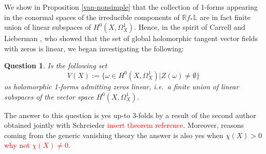 \documentclass[12pt,reqno]{amsart}
\theoremstyle{question}
\newtheorem{question}[theorem]{Question}
\theoremstyle{definition}
\theoremstyle{remark}
\newtheorem{remark}[theorem]{Remark}
\theoremstyle{cited}
\theoremstyle{citeddef}
\newcommand{\bbL}{\mathbb{L}}
\newcommand{\bbR}{\mathbb{R}}
\newcommand{\sorry}[1]{\textcolor{red}{#1}}
\begin{document}

We show in Proposition \ref{van-nonsimple} that the collection
of 1-forms appearing in the conormal spaces of the
irreducible components of $\bbR f_*\bbL$ are in fact finite union of linear subspaces of $H^0(X,\Omega_X^1)$. Hence, in the spirit of Carrell and Lieberman \cite{CL73}, who showed that
the set of global holomorphic tangent vector fields with zeros
is linear,
we began investigating the following:
\begin{question}
Is the following set
\[V(X):=\{ \omega\in H^0(X, \Omega_X^1) | Z(\omega)\neq \emptyset\}\]
os holomorphic 1-forms admitting zeros linear, i.e.\ a finite
union of linear subspaces of the vector space $H^0(X, \Omega_X^1)$.
\end{question} 

The answer to this question is yes up-to 3-folds by
a result of the second author obtained jointly with Schreieder
\sorry{insert theorem reference}. Moreover,
reasons coming from the generic vanishing theory 
the answer is also yes 
when $\chi(X)>0$ \sorry{why not $\chi(X)\neq 0$}. 
\end{document}
